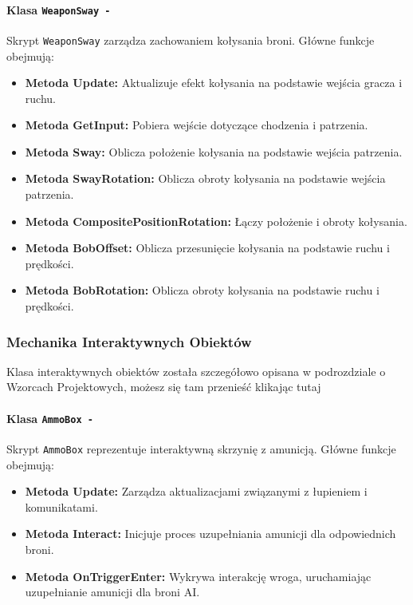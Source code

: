 \paragraph{Klasa \texttt{WeaponSway -}}
Skrypt \texttt{WeaponSway} zarządza zachowaniem kołysania broni. Główne funkcje obejmują:
\begin{itemize}
  \item \textbf{Metoda Update:} Aktualizuje efekt kołysania na podstawie wejścia gracza i ruchu.
  \item \textbf{Metoda GetInput:} Pobiera wejście dotyczące chodzenia i patrzenia.
  \item \textbf{Metoda Sway:} Oblicza położenie kołysania na podstawie wejścia patrzenia.
  \item \textbf{Metoda SwayRotation:} Oblicza obroty kołysania na podstawie wejścia patrzenia.
  \item \textbf{Metoda CompositePositionRotation:} Łączy położenie i obroty kołysania.
  \item \textbf{Metoda BobOffset:} Oblicza przesunięcie kołysania na podstawie ruchu i prędkości.
  \item \textbf{Metoda BobRotation:} Oblicza obroty kołysania na podstawie ruchu i prędkości.
\end{itemize}

\subsubsection{Mechanika Interaktywnych Obiektów}

Klasa interaktywnych obiektów została szczegółowo opisana w podrozdziale o Wzorcach Projektowych, możesz się tam przenieść klikając tutaj 
\paragraph{Klasa \texttt{AmmoBox -}}
Skrypt \texttt{AmmoBox} reprezentuje interaktywną skrzynię z amunicją. Główne funkcje obejmują:
\begin{itemize}
  \item \textbf{Metoda Update:} Zarządza aktualizacjami związanymi z łupieniem i komunikatami.
  \item \textbf{Metoda Interact:} Inicjuje proces uzupełniania amunicji dla odpowiednich broni.
  \item \textbf{Metoda OnTriggerEnter:} Wykrywa interakcję wroga, uruchamiając uzupełnianie amunicji dla broni AI.
\end{itemize}

